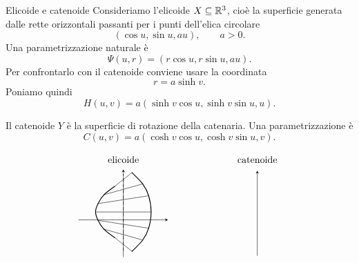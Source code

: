 \documentclass[a4paper]{article}
\begin{document}
\begin{snippetexample}{Elicoide e catenoide}
Consideriamo l'elicoide \(X\subseteq\mathbb{R}^3\), cioè la superficie generata dalle rette orizzontali passanti per i punti dell'elica circolare
\[
    (\cos u,\sin u,au),
    \qquad
    a>0.
\]
Una parametrizzazione naturale è
\[
    \Psi(u,r)=(r\cos u,r\sin u,au).
\]
Per confrontarlo con il catenoide conviene usare la coordinata
\[
    r=a\sinh v.
\]
Poniamo quindi
\[
    H(u,v)=a(\sinh v\cos u,\sinh v\sin u,u).
\]

Il catenoide \(Y\) è la superficie di rotazione della catenaria. Una parametrizzazione è
\[
    C(u,v)=a(\cosh v\cos u,\cosh v\sin u,v).
\]

\[
\begin{tikzpicture}[scale=0.9, line cap=round, line join=round, >=stealth]

    \begin{scope}[shift={(0,0)}]
        \node at (0,2.45) {elicoide};

        \draw[->] (-1.8,0) -- (1.8,0);
        \draw[->] (0,-1.5) -- (0,2.05);

        \draw[dashed] (0,-1.25) -- (0,1.85);

        \draw (-0.35,-0.72) -- ( 0.35,-1.28);
        \draw (-0.78,-0.38) -- ( 0.78,-0.82);
        \draw (-1.02,-0.02) -- ( 1.02,-0.34);
        \draw (-1.12, 0.32) -- ( 1.12, 0.32);
        \draw (-1.02, 0.66) -- ( 1.02, 0.98);
        \draw (-0.78, 1.02) -- ( 0.78, 1.46);
        \draw (-0.35, 1.36) -- ( 0.35, 1.92);

        \draw[thick] plot[smooth] coordinates {
            (-0.35,-0.72)
            (-0.78,-0.38)
            (-1.02,-0.02)
            (-1.12, 0.32)
            (-1.02, 0.66)
            (-0.78, 1.02)
            (-0.35, 1.36)
        };

        \draw[thick] plot[smooth] coordinates {
            ( 0.35,-1.28)
            ( 0.78,-0.82)
            ( 1.02,-0.34)
            ( 1.12, 0.32)
            ( 1.02, 0.98)
            ( 0.78, 1.46)
            ( 0.35, 1.92)
        };
    \end{scope}

    \begin{scope}[shift={(5.4,0)}]
        \node at (0,2.45) {catenoide};

        \draw[->] (0,-1.45) -- (0,2.0);


\end{scope}
\end{tikzpicture}\]
\end{snippetexample}
\end{document}
